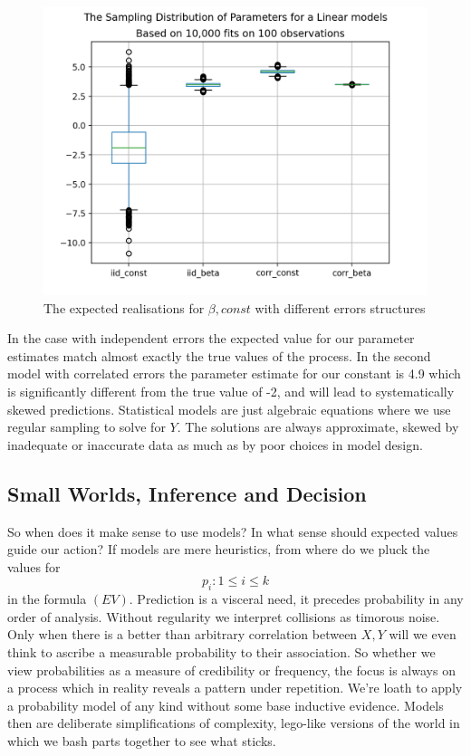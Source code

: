 \documentclass[10pt,a4paper,notitlepage, twocolumn]{article}
\begin{document}
\begin{figure}[H]
  \includegraphics[width=\linewidth]{./Plots/distribution_of_beta1.png}
  \caption{The expected realisations for $\beta, const$ with different errors structures}
\end{figure}

In the case with independent errors the expected value for our parameter estimates match almost exactly the true values of the process. In the second model with correlated errors the parameter estimate for our constant is 4.9 which is significantly different from the true value of -2, and will lead to systematically skewed predictions. Statistical models are just algebraic equations where we use regular sampling to solve for $Y$. The solutions are always approximate, skewed by inadequate or inaccurate data as much as by poor choices in model design. 

\subsection*{Small Worlds, Inference and Decision}
So when does it make sense to use models? In what sense should expected values guide our action? If models are mere heuristics, from where do we pluck the values for $$p_{i} : 1 \leq i \leq k$$ in the formula $(EV)$. Prediction is a visceral need, it precedes probability in any order of analysis. Without regularity we interpret collisions as timorous noise. Only when there is a better than arbitrary correlation between $X, Y$ will we even think to ascribe a measurable probability to their association. So whether we view probabilities as a measure of credibility or frequency, the focus is always on a process which in reality reveals a pattern under repetition. We're loath to apply a probability model of any kind without some base inductive evidence.
Models then are deliberate simplifications of complexity, lego-like versions of the world in which we bash parts together to see what sticks. 
\end{document}
